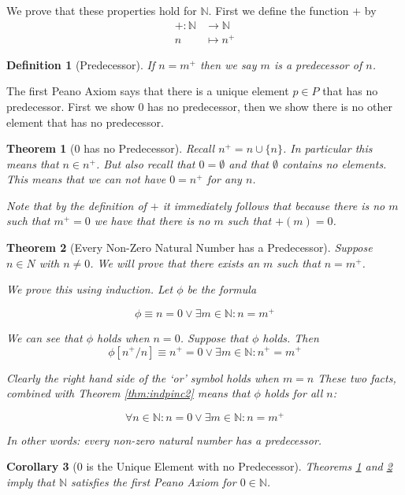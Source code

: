 \documentclass[12pt]{article}
\theoremstyle{break}
\newtheorem{definition}{Definition}[section]
\theoremstyle{break}
\newtheorem{theorem}{Theorem}[section]
\theoremstyle{break}
\newtheorem{corollary}[theorem]{Corollary}
\theoremstyle{break}
\theoremstyle{break}
\newtheorem{informal definition}[definition]{Informal Definition}
\begin{document}
We prove that these properties hold for $\mathbb{N}$.
First we define the function $+$ by
\begin{align*}
+: \mathbb{N} &\to \mathbb{N}\\
n &\mapsto n^+
\end{align*}

\begin{definition}[Predecessor]
If $n=m^+$ then we say $m$ is a predecessor of $n$.
\end{definition}

The first Peano Axiom says that there is a unique element $p\in P$ that has no predecessor.
First we show 0 has no predecessor, then we show there is no other element that has no predecessor.

\begin{theorem}[0 has no Predecessor]
\label{thm:zeronopred}
Recall $n^+ = n\cup \{n\}$.
In particular this means that $n\in n^+$.
But also recall that $0 = \emptyset$ and that $\emptyset$ contains no elements.
This means that we can not have $0 = n^+$ for any $n$.

Note that by the definition of $+$ it immediately follows that because there is no $m$ such that $m^+=0$ we have that there is no $m$ such that $+(m) = 0$.
\end{theorem}

\begin{theorem}[Every Non-Zero Natural Number has a Predecessor]
\label{thm:nonzerohaspred}
Suppose $n\in N$ with $n \not = 0$.
We will prove that there exists an $m$ such that $n = m^+$.

We prove this using induction.
Let $\phi$ be the formula

$$
\phi \equiv n=0 \lor \exists m \in \mathbb{N} : n = m^+
$$

We can see that $\phi$ holds when $n=0$.
Suppose that $\phi$ holds.
Then
$$
\phi[n^+/n] \equiv n^+ = 0 \lor \exists m\in \mathbb{N}: n^+ = m^+
$$

Clearly the right hand side of the `or' symbol holds when $m=n$
These two facts, combined with Theorem \ref{thm:indpinc2} means that $\phi$ holds for all $n$:

$$
\forall n \in \mathbb{N}: n = 0 \lor \exists m \in \mathbb{N}: n = m^+
$$

In other words: every non-zero natural number has a predecessor.
\end{theorem}

\begin{corollary}[0 is the Unique Element with no Predecessor]
Theorems \ref{thm:zeronopred} and \ref{thm:nonzerohaspred} imply that $\mathbb{N}$ satisfies the first Peano Axiom for $0\in \mathbb{N}$.
\end{corollary}
\end{document}
